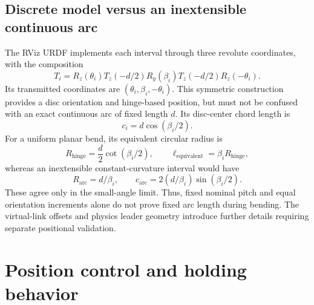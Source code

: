 \documentclass[11pt,letterpaper]{article}
\begin{document}
\subsection{Discrete model versus an inextensible continuous arc}
The RViz URDF implements each interval through three revolute coordinates,
with the composition
\begin{equation}
T_i=R_z(\theta_i)T_z(-d/2)R_y(\beta_i)
             T_z(-d/2)R_z(-\theta_i).
\label{eq:urdf}
\end{equation}
Its transmitted coordinates are $(\theta_i,\beta_i,-\theta_i)$.
This symmetric construction provides a disc orientation and hinge-based
position, but must not be confused with an exact continuous arc of fixed
length $d$. Its disc-center chord length is
\begin{equation}
c_i=d\cos(\beta_i/2).
\end{equation}
For a uniform planar bend, its equivalent circular radius is
\begin{equation}
R_{\mathrm{hinge}}=\frac{d}{2}\cot(\beta_i/2),\qquad
\ell_{\mathrm{equivalent}}=\beta_i R_{\mathrm{hinge}},
\end{equation}
whereas an inextensible constant-curvature interval would have
\begin{equation}
R_{\mathrm{arc}}=d/\beta_i,\qquad
c_{\mathrm{arc}}=2(d/\beta_i)\sin(\beta_i/2).
\end{equation}
These agree only in the small-angle limit.
Thus, fixed nominal pitch and equal orientation increments alone do not prove
fixed arc length during bending. The virtual-link offsets and physics leader
geometry introduce further details requiring separate positional validation.

\section{Position control and holding behavior}
\end{document}
